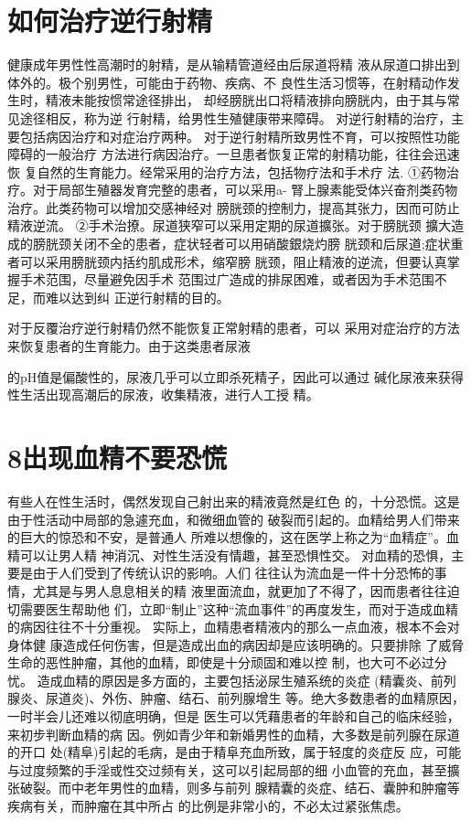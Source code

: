 \documentclass[12pt,UTF8]{ctexbook}
\begin{document}
\section{如何治疗逆行射精}
健康成年男性性高潮时的射精，是从输精管道经由后尿道将精
液从尿道口排出到体外的。极个别男性，可能由于药物、疾病、不
良性生活习惯等，在射精动作发生时，精液未能按惯常途径排出，
却经膀胱出口将精液排向膀胱内，由于其与常见途径相反，称为逆
行射精，给男性生殖健康带来障碍。
对逆行射精的治疗，主要包括病因治疗和对症治疗两种。
对于逆行射精所致男性不育，可以按照性功能障碍的一般治疗
方法进行病因治疗。一旦患者恢复正常的射精功能，往往会迅速恢
复自然的生育能力。经常采用的治疗方法，包括物疗法和手术疗
法.
①药物治疗。对于局部生殖器发育完整的患者，可以采用a-
腎上腺素能受体兴奋剂类药物治疗。此类药物可以增加交感神经对
膀胱颈的控制力，提高其张力，因而可防止精液逆流。
②手术治撩。尿道狭窄可以采用定期的尿道擴张。对于膀胱颈
擴大造成的膀胱颈关闭不全的患者，症状轻者可以用硝酸銀烧灼膀
胱颈和后尿道;症状重者可以采用膀胱颈内括约肌成形术，缩窄膀
胱颈，阻止精液的逆流，但要认真掌握手术范围，尽量避免因手术
范围过广造成的排尿困难，或者因为手术范围不足，而难以达到纠
正逆行射精的目的。

对于反覆治疗逆行射精仍然不能恢复正常射精的患者，可以
采用对症治疗的方法来恢复患者的生育能力。由于这类患者尿液

的pH值是偏酸性的，尿液几乎可以立即杀死精子，因此可以通过
碱化尿液来获得性生活出现高潮后的尿液，收集精液，进行人工授
精。
\section{8出现血精不要恐慌}

有些人在性生活时，偶然发现自己射出来的精液竟然是红色
的，十分恐慌。这是由于性活动中局部的急遽充血，和微细血管的
破裂而引起的。血精给男人们带来的巨大的惊恐和不安，是普通人
所难以想像的，这在医学上称之为“血精症”。血精可以让男人精
神消沉、对性生活没有情趣，甚至恐惧性交。
对血精的恐惧，主要是由于人们受到了传统认识的影响。人们
往往认为流血是一件十分恐怖的事情，尤其是与男人息息相关的精
液里面流血，就更加了不得了，因而患者往往迫切需要医生帮助他
们，立即“制止”这种“流血事件”的再度发生，而对于造成血精
的病因往往不十分重视。
实际上，血精患者精液内的那么一点血液，根本不会对身体健
康造成任何伤害，但是造成出血的病因却是应该明确的。只要排除
了威脅生命的恶性肿瘤，其他的血精，即使是十分顽固和难以控
制，也大可不必过分忧。
造成血精的原因是多方面的，主要包括泌尿生殖系统的炎症
(精囊炎、前列腺炎、尿道炎)、外伤、肿瘤、结石、前列腺增生
等。绝大多数患者的血精原因，一时半会儿还难以彻底明确，但是
医生可以凭藉患者的年龄和自己的临床经验，来初步判断血精的病
因。例如青少年和新婚男性的血精，大多数是前列腺在尿道的开口
处(精阜)引起的毛病，是由于精阜充血所致，属于轻度的炎症反
应，可能与过度频繁的手淫或性交过频有关，这可以引起局部的细
小血管的充血，甚至擴张破裂。而中老年男性的血精，则多与前列
腺精囊的炎症、结石、囊肿和肿瘤等疾病有关，而肿瘤在其中所占
的比例是非常小的，不必太过紧张焦虑。
\end{document}
